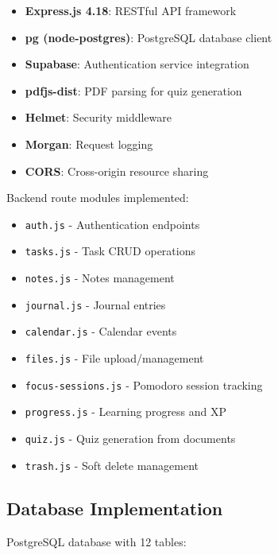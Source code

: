 \begin{itemize}
    \item \textbf{Express.js 4.18}: RESTful API framework
    \item \textbf{pg (node-postgres)}: PostgreSQL database client
    \item \textbf{Supabase}: Authentication service integration
    \item \textbf{pdfjs-dist}: PDF parsing for quiz generation
    \item \textbf{Helmet}: Security middleware
    \item \textbf{Morgan}: Request logging
    \item \textbf{CORS}: Cross-origin resource sharing
\end{itemize}

Backend route modules implemented:
\begin{itemize}
    \item \texttt{auth.js} - Authentication endpoints
    \item \texttt{tasks.js} - Task CRUD operations
    \item \texttt{notes.js} - Notes management
    \item \texttt{journal.js} - Journal entries
    \item \texttt{calendar.js} - Calendar events
    \item \texttt{files.js} - File upload/management
    \item \texttt{focus-sessions.js} - Pomodoro session tracking
    \item \texttt{progress.js} - Learning progress and XP
    \item \texttt{quiz.js} - Quiz generation from documents
    \item \texttt{trash.js} - Soft delete management
\end{itemize}

\subsection{Database Implementation}
PostgreSQL database with 12 tables:


